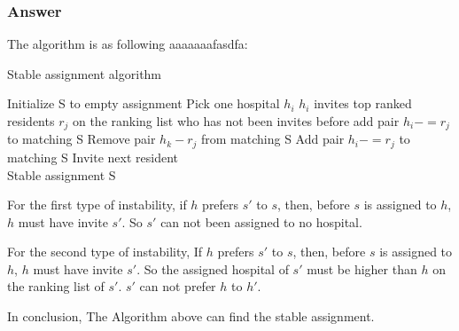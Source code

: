 \documentclass[a4paper]{article}
\begin{document}
\subsubsection*{Answer}
The algorithm is as following aaaaaaafasdfa:
\begin{algorithm}[!htb]
	\caption{Stable assignment algorithm}
	\begin{algorithmic}[1]
		\State Initialize S to empty assignment
		\State Pick one hospital $h_i$
		\State $h_i$ invites top ranked residents $r_j$ on the ranking list who has not been invites before
		\State add pair $h_i -= r_j$ to matching S
		\State Remove pair  $h_k - r_j$ from matching S
		\State Add pair $h_i -= r_j$ to matching S
		\Else
		\State Invite next resident
		\EndIf
		\EndWhile \\
		\Return Stable assignment S
	\end{algorithmic}
\end{algorithm}
\par For the first type of instability, if $h$ prefers $s'$ to $s$, then, before $s$ is assigned to $h$, $h$ must have invite $s'$. So $s'$ can not been assigned to no hospital.
\par For the second type of instability, If $h$ prefers $s'$ to $s$, then, before $s$ is assigned to $h$, $h$ must have invite $s'$. So the assigned hospital of $s'$ must be higher than $h$ on the ranking list of $s'$. $s'$ can not prefer $h$ to $h'$.
\par In conclusion, The Algorithm above can find the stable assignment.
\vspace{2cm}
\end{document}
